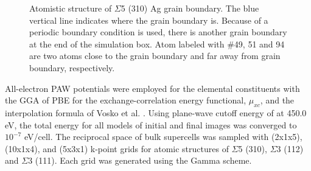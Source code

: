 \begingroup
\begin{figure}[!ht]
  \centering
  \caption[Atomistic structure of $\Sigma$5 (310) Ag grain boundary.]{Atomistic structure of $\Sigma$5 (310) Ag grain boundary. The blue vertical line indicates where the grain boundary is. Because of a periodic boundary condition is used, there is another grain boundary at the end of the simulation box. Atom labeled with \#49, 51 and 94 are two atoms close to the grain boundary and far away from grain boundary, respectively.}
  \label{Chap:Ag/ZnO:fig16}
\end{figure}
\endgroup


All-electron \ac{PAW} potentials were employed for the elemental constituents with the \ac{GGA} of \ac{PBE} for the exchange-correlation energy functional, $\mu_{xc}$, and the interpolation formula of Vosko et al. \cite{vosko1980accurate}. Using plane-wave cutoff energy of at 450.0 eV, the total energy for all models of initial and final images was converged to $10^{−7}$ eV/cell. The reciprocal space of bulk supercells was sampled with (2x1x5), (10x1x4), and (5x3x1) k-point grids for atomic structures of $\Sigma$5 (310), $\Sigma$3 (112) and $\Sigma$3 (111). Each grid was generated using the Gamma scheme.


